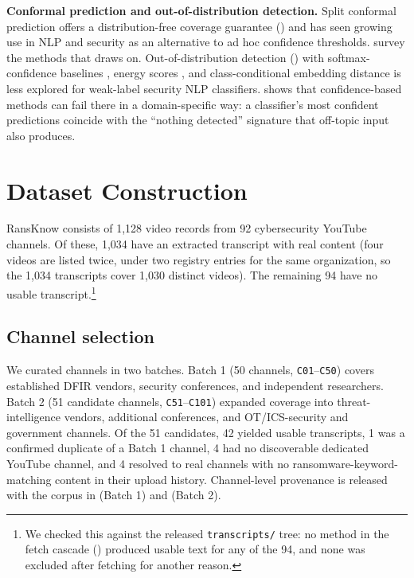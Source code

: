 \documentclass[preprint,12pt]{elsarticle}
\begin{document}
\textbf{Conformal prediction and out-of-distribution detection.} Split
conformal prediction \citep{vovk2005algorithmic, lei2018distribution}
offers a distribution-free coverage guarantee () and
has seen growing use in NLP and security as an alternative to ad hoc
confidence thresholds. \citet{angelopoulos2023gentle} survey the methods
that  draws on. Out-of-distribution detection
() with softmax-confidence baselines
\citep{hendrycks2017baseline}, energy scores \citep{liu2020energy}, and
class-conditional embedding distance \citep{lee2018simple} is less explored
for weak-label security NLP classifiers.  shows that
confidence-based methods can fail there in a domain-specific way: a
classifier's most confident predictions coincide with the ``nothing
detected'' signature that off-topic input also produces.

\section{Dataset Construction}
\label{sec:construction}

RansKnow \citep{ransknow_kaggle, ransknow_github} consists of 1{,}128 video
records from 92 cybersecurity YouTube channels. Of these, 1{,}034 have an
extracted transcript with real content (four videos are listed twice, under
two registry entries for the same organization, so the 1{,}034 transcripts
cover 1{,}030 distinct videos). The remaining 94 have no usable
transcript.\footnote{We checked this against the released
  \texttt{transcripts/} tree: no method in the fetch cascade
  () produced usable text for any of the 94, and none
  was excluded after fetching for another reason.}

\subsection{Channel selection}
We curated channels in two batches. Batch 1 (50 channels, \texttt{C01}--\texttt{C50})
covers established DFIR vendors, security conferences, and independent
researchers. Batch 2 (51 candidate channels, \texttt{C51}--\texttt{C101})
expanded coverage into threat-intelligence vendors, additional conferences,
and OT/ICS-security and government channels. Of the 51 candidates, 42
yielded usable transcripts, 1 was a confirmed duplicate of a Batch 1
channel, 4 had no discoverable dedicated YouTube channel, and 4 resolved to
real channels with no ransomware-keyword-matching content in their upload
history. Channel-level provenance is released with the corpus in
(Batch 1) and 
(Batch 2).
\end{document}

